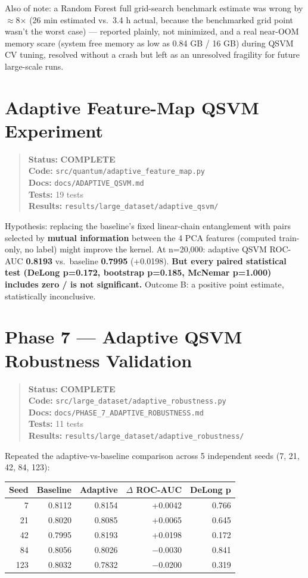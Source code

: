 \documentclass[11pt,a4paper]{article}
\newcommand{\code}[1]{\texttt{\small #1}}
\newcommand{\done}{\textcolor{donecolor}{\textbf{COMPLETE}}}
\newcommand{\phasestatus}[5]{%
\begin{quote}\small\raggedright
\textbf{Status:} #1 \\
\textbf{Code:} #2 \\
\textbf{Docs:} #3 \\
\textbf{Tests:} #4 \\
\textbf{Results:} #5
\end{quote}}
\begin{document}
Also of note: a Random Forest full grid-search benchmark estimate was wrong by $\approx$8$\times$ (26 min estimated vs.\ 3.4 h actual, because the benchmarked grid point wasn't the worst case) --- reported plainly, not minimized, and a real near-OOM memory scare (system free memory as low as 0.84 GB / 16 GB) during QSVM CV tuning, resolved without a crash but left as an unresolved fragility for future large-scale runs.

\section{Adaptive Feature-Map QSVM Experiment}
\label{sec:adaptive}

\phasestatus{\done}{\code{src/quantum/adaptive\_feature\_map.py}}{\code{docs/ADAPTIVE\_QSVM.md}}{19 tests}{\code{results/large\_dataset/adaptive\_qsvm/}}

Hypothesis: replacing the baseline's fixed linear-chain entanglement with pairs selected by \textbf{mutual information} between the 4 PCA features (computed train-only, no label) might improve the kernel. At n=20,000: adaptive QSVM ROC-AUC \textbf{0.8193} vs.\ baseline \textbf{0.7995} (+0.0198). \textbf{But every paired statistical test (DeLong p=0.172, bootstrap p=0.185, McNemar p=1.000) includes zero / is not significant.} Outcome B: a positive point estimate, statistically inconclusive.

\section{Phase 7 --- Adaptive QSVM Robustness Validation}
\label{sec:phase7}

\phasestatus{\done}{\code{src/large\_dataset/adaptive\_robustness.py}}{\code{docs/PHASE\_7\_ADAPTIVE\_ROBUSTNESS.md}}{11 tests}{\code{results/large\_dataset/adaptive\_robustness/}}

Repeated the adaptive-vs-baseline comparison across 5 independent seeds (7, 21, 42, 84, 123):

\begin{center}
\small
\begin{tabular}{@{}rrrrr@{}}
\toprule
\textbf{Seed} & \textbf{Baseline} & \textbf{Adaptive} & \textbf{$\Delta$ ROC-AUC} & \textbf{DeLong p} \\
\midrule
7 & 0.8112 & 0.8154 & +0.0042 & 0.766 \\
21 & 0.8020 & 0.8085 & +0.0065 & 0.645 \\
42 & 0.7995 & 0.8193 & +0.0198 & 0.172 \\
84 & 0.8056 & 0.8026 & $-$0.0030 & 0.841 \\
123 & 0.8032 & 0.7832 & $-$0.0200 & 0.319 \\
\bottomrule
\end{tabular}
\end{center}
\end{document}
